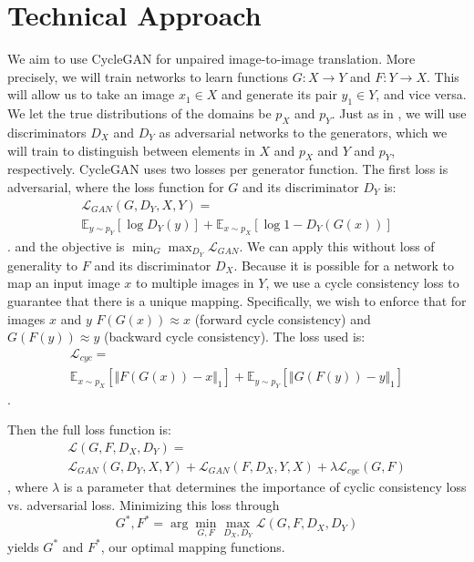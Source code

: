 \documentclass[10pt,twocolumn,letterpaper]{article}
\begin{document}
\section{Technical Approach}
We aim to use CycleGAN \cite{cycleGAN} for unpaired image-to-image translation.
More precisely, we will train networks to learn functions $G : X \rightarrow Y$ and $F: Y \rightarrow X$.
This will allow us to take an image $x_1 \in X$ and generate its pair $y_1 \in Y$, and vice versa.
We let the true distributions of the domains be $p_X$ and $p_Y$.
Just as in \cite{gan}, we will use discriminators $D_X$ and $D_Y$ as adversarial networks to the generators, which we will train to distinguish between elements in $X$ and $p_X$ and $Y$ and $p_Y$, respectively.
CycleGAN uses two losses per generator function.
The first loss is adversarial, where the loss function for $G$ and its discriminator $D_Y$ is:
\begin{multline}
\displaystyle \mathcal{L}_{GAN}(G, D_Y, X, Y) = \\
\mathbb{E}_{y \sim p_Y}[\log{D_Y(y)}]
+ \mathbb{E}_{x \sim p_X}[\log{1 - D_Y(G(x))}]
\end{multline}.
and the objective is $\displaystyle \min_{G} \max_{D_Y} \mathcal{L}_{GAN}$.
We can apply this without loss of generality to $F$ and its discriminator $D_X$.
Because it is possible for a network to map an input image $x$ to multiple images in $Y$, we use a cycle consistency loss to guarantee that there is a unique mapping.
Specifically, we wish to enforce that for images $x$ and $y$ $F(G(x)) \approx x$ (forward cycle consistency) and $G(F(y)) \approx y$ (backward cycle consistency).
The loss used is:
\begin{multline}
\displaystyle \mathcal{L}_{cyc} = \\
\mathbb{E}_{x \sim p_X}[\Vert{F(G(x)) - x}\Vert_1]
+ \mathbb{E}_{y \sim p_Y}[\Vert{G(F(y)) - y}\Vert_1]
\end{multline}.

Then the full loss function is:
\begin{multline}
\displaystyle \mathcal{L}(G, F, D_X, D_Y) = \\
\mathcal{L}_{GAN}(G, D_Y, X, Y)
+ \mathcal{L}_{GAN}(F, D_X, Y, X)
+ \lambda\mathcal{L}_{cyc}(G, F)
\end{multline},
where $\lambda$ is a parameter that determines the importance of cyclic consistency loss vs. adversarial loss.
Minimizing this loss through
\begin{equation}
\displaystyle G^*, F^* = \arg\min_{G, F}\max_{D_X, D_Y} \mathcal{L}(G, F, D_X, D_Y)
\end{equation}
yields $G^*$ and $F^*$, our optimal mapping functions.
\end{document}
